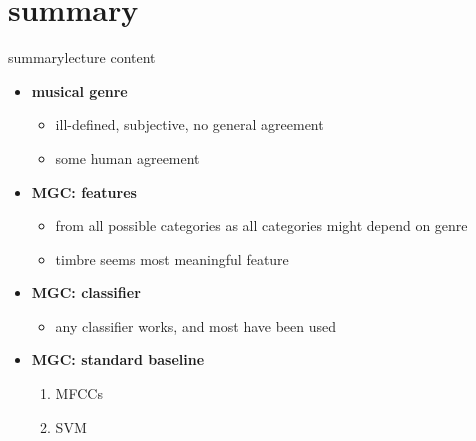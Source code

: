     \section{summary}
        \begin{frame}{summary}{lecture content}
            \begin{itemize}
                \item   \textbf{musical genre}
                    \begin{itemize}
                        \item   ill-defined, subjective, no general agreement
                        \item   some human agreement
                    \end{itemize}
                \bigskip
                \item   \textbf{MGC: features}
                    \begin{itemize}
                        \item   from all possible categories as all categories might depend on genre
                        \item   timbre seems most meaningful feature
                    \end{itemize}
                \bigskip
                \item   \textbf{MGC: classifier}
                    \begin{itemize}
                        \item   any classifier works, and most have been used
                    \end{itemize}
                \bigskip
                \item   \textbf{MGC: standard baseline}
                    \begin{enumerate}
                        \item   MFCCs
                        \item   SVM
                    \end{enumerate}
            \end{itemize}
        \end{frame}

